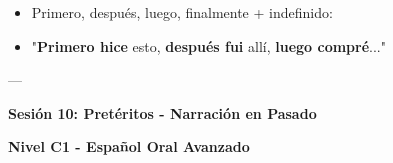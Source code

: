\documentclass[a4paper,11pt]{article}
\begin{document}
\begin{itemize}

  \item Primero, después, luego, finalmente + indefinido:

  \item "\textbf{Primero hice} esto, \textbf{después fui} allí, \textbf{luego compré}..."

\end{itemize}

\vspace{0.2cm}

---

\vspace{0.2cm}

\textbf{Sesión 10: Pretéritos - Narración en Pasado}

\textbf{Nivel C1 - Español Oral Avanzado}

\vspace{0.2cm}
\end{document}
